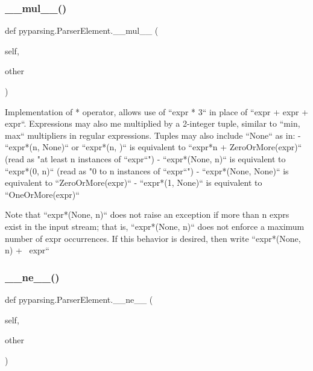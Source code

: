 \mbox{\label{classpyparsing_1_1ParserElement_ada800b289dc07ee269e242ae6f877a4b}} 
\subsubsection{\texorpdfstring{\+\_\+\+\_\+mul\+\_\+\+\_\+()}{\_\_mul\_\_()}}
{\footnotesize\ttfamily def pyparsing.\+Parser\+Element.\+\_\+\+\_\+mul\+\_\+\+\_\+ (\begin{DoxyParamCaption}\item[{}]{self,  }\item[{}]{other }\end{DoxyParamCaption})}

\begin{DoxyVerb}Implementation of * operator, allows use of ``expr * 3`` in place of
``expr + expr + expr``.  Expressions may also me multiplied by a 2-integer
tuple, similar to ``{min, max}`` multipliers in regular expressions.  Tuples
may also include ``None`` as in:
 - ``expr*(n, None)`` or ``expr*(n, )`` is equivalent
      to ``expr*n + ZeroOrMore(expr)``
      (read as "at least n instances of ``expr``")
 - ``expr*(None, n)`` is equivalent to ``expr*(0, n)``
      (read as "0 to n instances of ``expr``")
 - ``expr*(None, None)`` is equivalent to ``ZeroOrMore(expr)``
 - ``expr*(1, None)`` is equivalent to ``OneOrMore(expr)``

Note that ``expr*(None, n)`` does not raise an exception if
more than n exprs exist in the input stream; that is,
``expr*(None, n)`` does not enforce a maximum number of expr
occurrences.  If this behavior is desired, then write
``expr*(None, n) + ~expr``
\end{DoxyVerb}
 \mbox{\label{classpyparsing_1_1ParserElement_a3ac9c1ebf1401b4aed12a88eafd18194}} 
\subsubsection{\texorpdfstring{\+\_\+\+\_\+ne\+\_\+\+\_\+()}{\_\_ne\_\_()}}
{\footnotesize\ttfamily def pyparsing.\+Parser\+Element.\+\_\+\+\_\+ne\+\_\+\+\_\+ (\begin{DoxyParamCaption}\item[{}]{self,  }\item[{}]{other }\end{DoxyParamCaption})}

